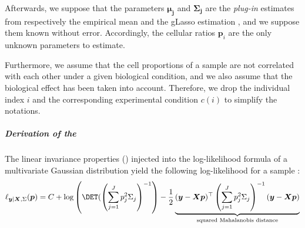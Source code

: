 Afterwards, we suppose that the parameters $\boldsymbol{\mu_j}$ and $\boldsymbol{\Sigma_j}$ are the \textit{plug-in} estimates from respectively the empirical mean and the gLasso estimation , and we suppose them known without error. Accordingly, the cellular ratios $\boldsymbol{p}_i$ are the only unknown parameters to estimate.

Furthermore, we assume that the cell proportions of a sample are not correlated with each other under a given biological condition, and we also assume that the biological effect has been taken into account.  Therefore, we drop the individual index $i$ and the corresponding experimental condition $c(i)$ to simplify the notations.

\subparagraph{Derivation of the }

The linear invariance properties () injected into the log-likelihood formula of a multivariate Gaussian distribution  yield the following log-likelihood for a sample :
\begin{equation}
    \label{eq:12}
\ell_{\boldsymbol{y} | \boldsymbol{X}, \Sigma}(\boldsymbol{p})=C + \log\left(\DET(\left(\sum_{j=1}^J p_{j}^2\Sigma_{j}\right)^{-1}\right) - \frac{1}{2} \underbrace{(\boldsymbol{y} - \boldsymbol{X} \boldsymbol{p})^\top \left(\sum_{j=1}^J p_{j}^2\Sigma_{j}\right)^{-1} (\boldsymbol{y} - \boldsymbol{X}\boldsymbol{p})}_{\text{squared Mahalanobis distance}}   
\end{equation}

